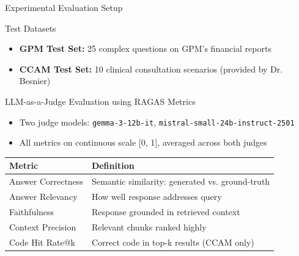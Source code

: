 \documentclass[11pt, aspectratio=169, xcolor=table]{beamer}
\begin{document}
\begin{frame}{Experimental Evaluation Setup}
    \begin{block}{Test Datasets}
        \begin{itemize}
            \item \textbf{GPM Test Set:} 25 complex questions on GPM's financial reports
            \item \textbf{CCAM Test Set:} 10 clinical consultation scenarios (provided by Dr. Besnier)
        \end{itemize}
    \end{block}

    \begin{block}{LLM-as-a-Judge Evaluation using RAGAS Metrics}
        \begin{itemize}
            \item Two judge models: \texttt{gemma-3-12b-it}, \texttt{mistral-small-24b-instruct-2501}
            \item All metrics on continuous scale [0, 1], averaged across both judges
        \end{itemize}
    \end{block}

    \begin{table}
        \centering
        \small
        \begin{tabular}{lp{8cm}}
            \toprule
            \textbf{Metric} & \textbf{Definition} \\
            \midrule
            Answer Correctness & Semantic similarity: generated vs. ground-truth \\
            Answer Relevancy & How well response addresses query \\
            Faithfulness & Response grounded in retrieved context \\
            Context Precision & Relevant chunks ranked highly \\
            Code Hit Rate@k & Correct code in top-k results (CCAM only) \\
            \bottomrule
        \end{tabular}
    \end{table}
\end{frame}
\end{document}
